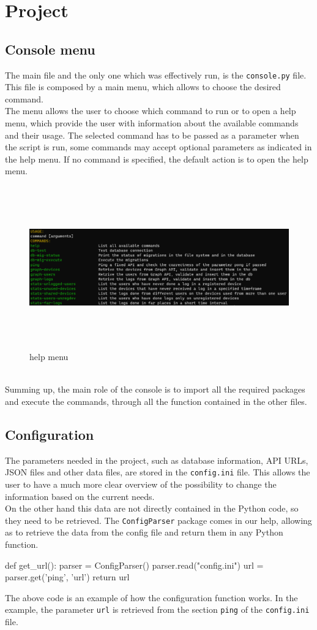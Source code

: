 \documentclass[12pt, a4paper, oneside]{article}
\begin{document}
\newpage
\section{Project}
\subsection{Console menu}
The main file and the only one which was effectively run, is the \texttt{console.py} file. This file is composed by a main menu, which allows to choose the desired command.\\
The menu allows the user to choose which command to run or to open a help menu, which provide the user with information about the available commands and their usage. The selected command has to be passed as a
parameter when the script is run, some commands may accept optional parameters as indicated in the help menu. If no command is specified, the default action is to open the help menu.
\begin{figure}[h]
    \centering
    \includegraphics[width=\textwidth, height=7cm]{help-menu.png}
    \caption{help menu}
\end{figure}\\
Summing up, the main role of the console is to import all the required packages and execute the commands, through all the function contained in the other files.

\subsection{Configuration}
The parameters needed in the project, such as database information, API URLs, JSON files and other data files, are stored in the \texttt{config.ini} file. This allows the user to have a much more clear
overview of the possibility to change the information based on the current needs.\\
On the other hand this data are not directly contained in the Python code, so they need to be retrieved. The \texttt{ConfigParser} package comes in our help, allowing as to retrieve the data from the config file
and return them in any Python function.
\begin{python}
    def get_url():
        parser = ConfigParser()
        parser.read("config.ini")
        url = parser.get('ping', 'url')
        return url
\end{python}
The above code is an example of how the configuration function works. In the example, the parameter \texttt{url} is retrieved from the section \texttt{ping} of the \texttt{config.ini} file.
\end{document}
